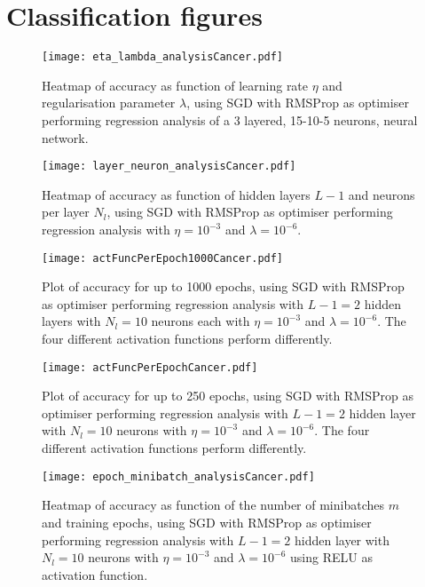 \clearpage

\section{Classification figures}\label{app:classification}

\begin{figure}[h!]
    \texttt{[image: eta\_lambda\_analysisCancer.pdf]}
    \caption{Heatmap of accuracy as function of learning rate $\eta$ and regularisation parameter $\lambda$, using SGD with RMSProp as optimiser performing regression analysis of a 3 layered, 15-10-5 neurons, neural network. }
    \label{fig:class_eta_lambda}
\end{figure}

\begin{figure}[h!]
    \texttt{[image: layer\_neuron\_analysisCancer.pdf]}
    \caption{Heatmap of accuracy as function of hidden layers $L-1$ and neurons per layer $N_l$, using SGD with RMSProp as optimiser performing regression analysis with $\eta=10^{-3}$ and $\lambda=10^{-6}$.}
    \label{fig:class_layer_neuron}
\end{figure}

\begin{figure}[h!]
    \texttt{[image: actFuncPerEpoch1000Cancer.pdf]}
    \caption{Plot of accuracy for up to 1000 epochs, using SGD with RMSProp as optimiser performing regression analysis with $L-1=2$ hidden layers with $N_l=10$ neurons each with $\eta=10^{-3}$ and $\lambda=10^{-6}$. The four different activation functions perform differently.}
    \label{fig:class_act_epoch1000}
\end{figure}

\begin{figure}[h!]
    \texttt{[image: actFuncPerEpochCancer.pdf]}
    \caption{Plot of accuracy for up to 250 epochs, using SGD with RMSProp as optimiser performing regression analysis with $L-1=2$ hidden layer with $N_l=10$ neurons with $\eta=10^{-3}$ and $\lambda=10^{-6}$. The four different activation functions perform differently.}
    \label{fig:class_act_epoch}
\end{figure}

\begin{figure}[h!]
    \texttt{[image: epoch\_minibatch\_analysisCancer.pdf]}
    \caption{Heatmap of accuracy as function of the number of minibatches $m$ and training epochs, using SGD with RMSProp as optimiser performing regression analysis with $L-1=2$ hidden layer with $N_l=10$ neurons with $\eta=10^{-3}$ and $\lambda=10^{-6}$ using RELU as activation function. }
    \label{fig:class_minibatch_epoch}
\end{figure}


